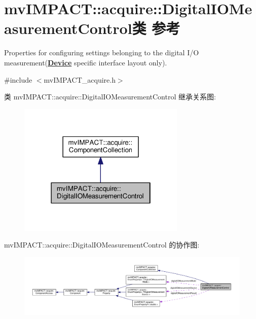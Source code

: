 \hypertarget{classmv_i_m_p_a_c_t_1_1acquire_1_1_digital_i_o_measurement_control}{\section{mv\+I\+M\+P\+A\+C\+T\+:\+:acquire\+:\+:Digital\+I\+O\+Measurement\+Control类 参考}
\label{classmv_i_m_p_a_c_t_1_1acquire_1_1_digital_i_o_measurement_control}
}


Properties for configuring settings belonging to the digital I/\+O measurement({\bfseries \hyperlink{classmv_i_m_p_a_c_t_1_1acquire_1_1_device}{Device}} specific interface layout only).  




{\ttfamily \#include $<$mv\+I\+M\+P\+A\+C\+T\+\_\+acquire.\+h$>$}



类 mv\+I\+M\+P\+A\+C\+T\+:\+:acquire\+:\+:Digital\+I\+O\+Measurement\+Control 继承关系图\+:
\nopagebreak
\begin{figure}[H]
\begin{center}
\leavevmode
\includegraphics[width=226pt]{classmv_i_m_p_a_c_t_1_1acquire_1_1_digital_i_o_measurement_control__inherit__graph}
\end{center}
\end{figure}


mv\+I\+M\+P\+A\+C\+T\+:\+:acquire\+:\+:Digital\+I\+O\+Measurement\+Control 的协作图\+:
\nopagebreak
\begin{figure}[H]
\begin{center}
\leavevmode
\includegraphics[width=350pt]{classmv_i_m_p_a_c_t_1_1acquire_1_1_digital_i_o_measurement_control__coll__graph}
\end{center}
\end{figure}
